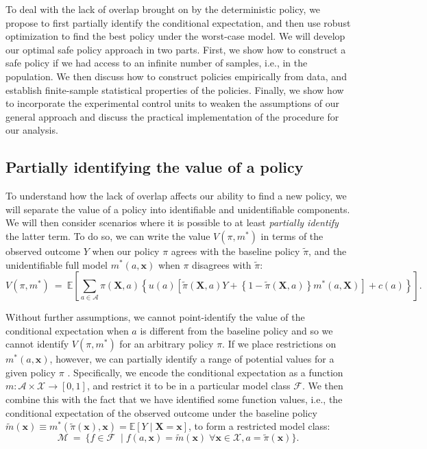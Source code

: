 \documentclass[12pt]{article}
\theoremstyle{definition}
\newcommand{\E}{\ensuremath{\mathbb{E}}}
\newcommand{\bX}{\bm X}
\newcommand{\bx}{\bm x}
\newcommand{\<}{\langle}
\renewcommand{\>}{\rangle}
\newcommand\mcal[1]{\ensuremath{\mathcal{#1}}}
\begin{document}
To deal with the lack of overlap brought on by the deterministic
policy, we propose to first partially identify the conditional
expectation, and then use robust optimization to find the best policy
under the worst-case model.  We will develop our optimal safe policy
approach in two parts.  First, we show how to construct a safe policy
if we had access to an infinite number of samples, i.e., in the
population.  We then discuss how to construct policies empirically
from data, and establish finite-sample statistical properties of the policies.
Finally, we show how to incorporate the experimental
control units to weaken the assumptions of our general approach and
discuss the practical implementation of the procedure for our
analysis.




\subsection{Partially identifying the value of a policy}
\label{sec:partial}

To understand how the lack of overlap affects our ability to find a
new policy, we will separate the value of a policy into identifiable
and unidentifiable components.  We will then consider scenarios where
it is possible to at least \emph{partially identify} the latter term.
To do so, we can write the value $V(\pi,m^\ast)$ in terms of the observed outcome
$Y$ when our policy $\pi$ agrees with the baseline policy
$\tilde{\pi}$, and the unidentifiable full model $m^\ast(a,\bx)$ when $\pi$
disagrees with $\tilde{\pi}$:
\begin{equation}
  \label{eq:value_model}
    V(\pi, m^\ast) \ = \ \E\left[\sum_{a \in \mathcal{A}} \pi(\bX, a) \left\{
        u(a) \left[\tilde{\pi}(\bX, a) Y + \left\{1 - \tilde{\pi}(\bX,a)\right\}
         m^\ast(a, \bX)\right]+c(a)\right\} \right].
\end{equation}
  
Without further assumptions, we cannot point-identify the value of the
conditional expectation when $a$ is different from the baseline policy
and so we cannot identify $V(\pi,m^\ast)$ for an arbitrary policy $\pi$. 
If we place restrictions on $m^\ast(a,\bx)$, however, we can partially
identify a range of potential values for a given policy $\pi$
\citep{Manski2005_partial}.  Specifically, we encode the conditional
expectation as a function $m:\mathcal{A} \times \mcal{X} \to [0,1]$,
and restrict it to be in a particular model class $\mcal{F}$.  We then
combine this with the fact that we have identified some function
values, i.e., the conditional expectation of the observed outcome
under the baseline policy
$\tilde{m}(\bx) \equiv m^\ast(\tilde{\pi}(\bx),\bx) = \E[Y \mid \bX = \bx] $, to
form a restricted model class:
\begin{equation}
  \label{eq:restricted_class}
  \mcal{M} \ = \ \{f \in \mcal{F} \; \mid f(a, \bx) = \tilde{m}(\bx) \; \forall \bx \in \mathcal{X}, a = \tilde{\pi}(\bx)\}.
\end{equation}
\end{document}
